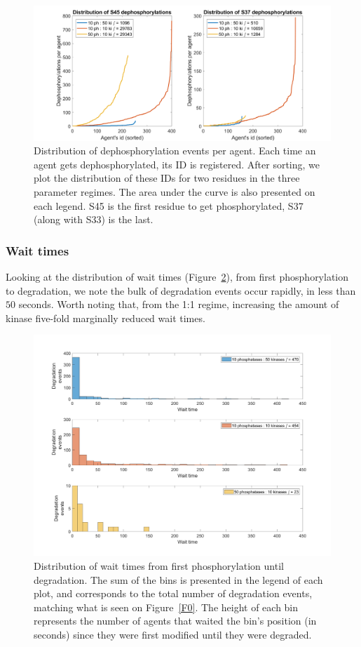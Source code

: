 \begin{figure}[h]
  \centering
  \includegraphics[width=\columnwidth]{wnt/F1_distribution_dephosphorylations_per_agent_brief.png}
  \caption{Distribution of dephosphorylation events per agent. Each
    time an agent gets dephosphorylated, its ID is registered. After
    sorting, we plot the distribution of these IDs for two residues in
    the three parameter regimes. The area under the curve is also
    presented on each legend. S45 is the first residue to get
    phosphorylated, S37 (along with S33) is the last.}
  \label{F1}
\end{figure}


\subsubsection*{Wait times}
Looking at the distribution of wait times (Figure~\ref{F2}), from
first phosphorylation to degradation, we note the bulk of degradation
events occur rapidly, in less than $50$ seconds. Worth noting that,
from the 1:1 regime, increasing the amount of kinase five-fold
marginally reduced wait times.

\begin{figure}[h]
  \centering
  \includegraphics[width=\columnwidth]{wnt/F2_wait_times.png}
  \caption{Distribution of wait times from first phosphorylation until
    degradation. The sum of the bins is presented in the legend of
    each plot, and corresponds to the total number of degradation
    events, matching what is seen on Figure~\ref{F0}. The height of
    each bin represents the number of agents that waited the bin's
    position (in seconds) since they were first modified until they
    were degraded.}
  \label{F2}
\end{figure}


